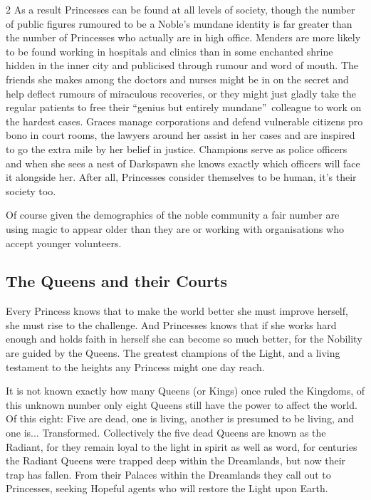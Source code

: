 \begin{multicols}{2}
As a result Princesses can be found at all levels of society, though the number of public figures rumoured to be a Noble's mundane identity is far greater than the number of Princesses who actually are in high office. Menders are more likely to be found working in hospitals and clinics than in some enchanted shrine hidden in the inner city and publicised through rumour and word of mouth. The friends she makes among the doctors and nurses might be in on the secret and help deflect rumours of miraculous recoveries, or they might just gladly take the regular patients to free their \textquotedblleft genius but entirely mundane\textquotedblright\, colleague to work on the hardest cases. Graces manage corporations and defend vulnerable citizens pro bono in court rooms, the lawyers around her assist in her cases and are inspired to go the extra mile by her belief in justice. Champions serve as police officers and when she sees a nest of Darkspawn she knows exactly which officers will face it alongside her. After all, Princesses consider themselves to be human, it's their society too. 

Of course given the demographics of the noble community a fair number are using magic to appear older than they are or working with organisations who accept younger volunteers. 

\subsection*{The Queens and their Courts}

Every Princess knows that to make the world better she must improve herself, she must rise to the challenge. And Princesses knows that if she works hard enough and holds faith in herself she can become so much better, for the Nobility are guided by the Queens. The greatest champions of the Light, and a living testament to the heights any Princess might one day reach. 

It is not known exactly how many Queens (or Kings) once ruled the Kingdoms, of this unknown number only eight Queens still have the power to affect the world. Of this eight: Five are dead, one is living, another is presumed to be living, and one is... Transformed. Collectively the five dead Queens are known as the Radiant, for they remain loyal to the light in spirit as well as word, for centuries the Radiant Queens were trapped deep within the Dreamlands, but now their trap has fallen. From their Palaces within the Dreamlands they call out to Princesses, seeking Hopeful agents who will restore the Light upon Earth. 


\end{multicols}
